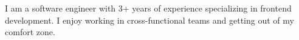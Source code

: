

\begin{cvparagraph}

I am a software engineer with 3+ years of experience specializing in frontend development. I enjoy working in cross-functional teams and getting out of my comfort zone.
\end{cvparagraph}

